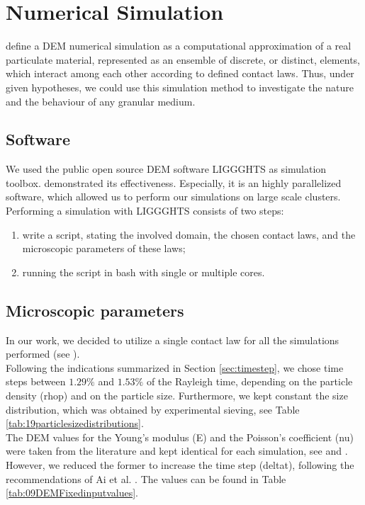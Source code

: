 
\chapter{Numerical Simulation}
\label{cap:numericalsimulation}

\citet{RefWorks:172} define a \acs{DEM} numerical simulation as a computational
approximation of a real particulate material, represented as an ensemble of discrete, or distinct, elements, which
interact among each other according to defined contact laws.
Thus, under given hypotheses, we could use this simulation method to investigate
the nature and the behaviour of any granular medium.\\

\section{Software}
\label{sec:software}

We used the public open source \acs{DEM} software \acs{LIGGGHTS} as simulation toolbox.
\citet{RefWorks:136, RefWorks:206} demonstrated its effectiveness.
Especially, it is an highly parallelized software, which allowed us to perform
our simulations on large scale clusters.\\
Performing a simulation with \acs{LIGGGHTS} consists of two steps:
\begin{enumerate}
  \item{write a script, stating the involved domain, the chosen contact laws,
  and the microscopic parameters of these laws;}
  \item{running the script in bash with single or multiple cores.}
\end{enumerate}

\section{Microscopic parameters}
\label{sec:microscopicparameters}

In our work, we decided to utilize a single
contact law for all the simulations performed (see \citet{RefWorks:205}).\\
Following the indications summarized in Section \ref{sec:timestep}, we chose
time steps between $1.29 \%$ and $1.53 \%$ of the Rayleigh time, 
depending on the particle density (\acs{rhop}) and on the particle size.
Furthermore, we kept constant the size distribution, which was obtained by
experimental sieving, see Table \ref{tab:19particlesizedistributions}.\\
The \acs{DEM} values for the Young's modulus (\acs{E}) and the Poisson's
coefficient (\acs{nu}) were taken from the literature and kept identical for
each simulation, see \cite{RefWorks:175} and \cite{RefWorks:176}. However, we
reduced the former to increase the time step (\acs{deltat}), following the recommendations of Ai et al.
\cite{RefWorks:131}.
The values can be found in Table \ref{tab:09DEMFixedinputvalues}. \\

